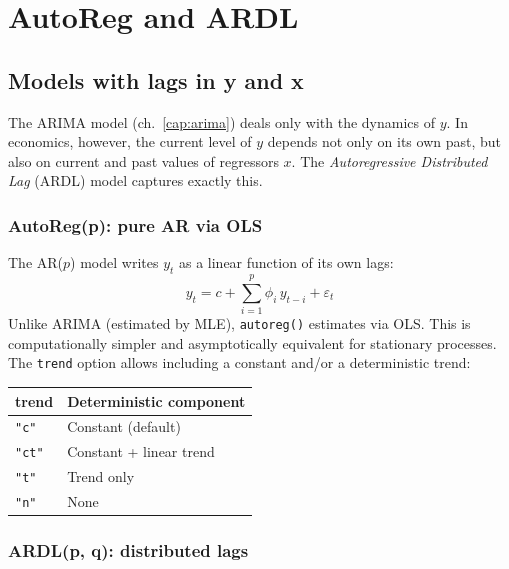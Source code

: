 \chapter{AutoReg and ARDL}
\label{cap:ardl}

\section{Models with lags in y and x}

The ARIMA model (ch.~\ref{cap:arima}) deals only with the dynamics of $y$.
In economics, however, the current level of $y$ depends not only on its own past,
but also on current and past values of regressors $x$. The
\emph{Autoregressive Distributed Lag} (ARDL) model captures exactly this.

\subsection*{AutoReg(p): pure AR via OLS}

The AR($p$) model writes $y_t$ as a linear function of its own lags:
\[
  y_t = c + \sum_{i=1}^p \phi_i\, y_{t-i} + \varepsilon_t
\]
Unlike ARIMA (estimated by MLE), \texttt{autoreg()} estimates via
OLS. This is computationally simpler and asymptotically equivalent
for stationary processes. The \texttt{trend} option allows including
a constant and/or a deterministic trend:

\begin{center}
\begin{tabular}{ll}
\toprule
\textbf{trend} & \textbf{Deterministic component} \\
\midrule
\texttt{"c"}  & Constant (default) \\
\texttt{"ct"} & Constant + linear trend \\
\texttt{"t"}  & Trend only \\
\texttt{"n"}  & None \\
\bottomrule
\end{tabular}
\end{center}

\subsection*{ARDL(p, q): distributed lags}

